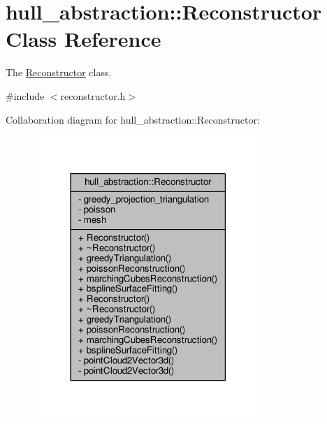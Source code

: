 \hypertarget{classhull__abstraction_1_1_reconstructor}{}\section{hull\+\_\+abstraction\+:\+:Reconstructor Class Reference}
\label{classhull__abstraction_1_1_reconstructor}


The \hyperlink{classhull__abstraction_1_1_reconstructor}{Reconstructor} class.  




{\ttfamily \#include $<$reconstructor.\+h$>$}



Collaboration diagram for hull\+\_\+abstraction\+:\+:Reconstructor\+:\nopagebreak
\begin{figure}[H]
\begin{center}
\leavevmode
\includegraphics[width=246pt]{classhull__abstraction_1_1_reconstructor__coll__graph}
\end{center}
\end{figure}
